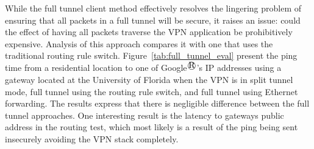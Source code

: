 While the full tunnel client method effectively resolves the lingering problem
of ensuring that all packets in a full tunnel will be secure, it raises an
issue:  could the effect of having all packets traverse the VPN application be
prohibitively expensive.  Analysis of this approach compares it with one that
uses the traditional routing rule switch.  Figure~\ref{tab:full_tunnel_eval}
present the ping time from a residential location to one of Google$^\registered$'s IP
addresses using a gateway located at the University of Florida when the VPN is
in split tunnel mode, full tunnel using the routing rule switch, and full
tunnel using Ethernet forwarding.  The results express that there is negligible
difference between the full tunnel approaches.  One interesting result is the
latency to gateways public address in the routing test, which most likely is a
result of the ping being sent insecurely avoiding the VPN stack completely.
